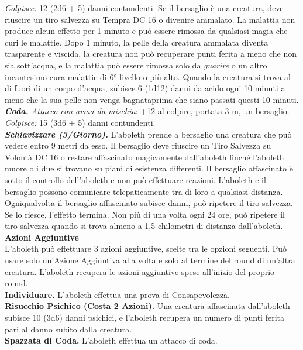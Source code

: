 \begin{multicols}{2}
\emph{Colpisce:} 12 (2d6 + 5) danni contundenti. Se il bersaglio è una creatura, deve riuscire un tiro salvezza su Tempra DC  16 o divenire ammalato. La malattia non produce alcun effetto per 1 minuto e può essere rimossa da qualsiasi magia che curi le malattie. Dopo 1 minuto, la pelle della creatura ammalata diventa trasparente e viscida, la creatura non può recuperare punti ferita a meno che non sia sott'acqua, e la malattia può essere rimossa solo da \emph{guarire} o un altro incantesimo cura malattie di 6° livello o più alto. Quando la creatura si trova al di fuori di un corpo d'acqua, subisce 6 (1d12) danni da acido ogni 10 minuti a meno che la sua pelle non venga bagnataprima che siano  passati questi 10 minuti. \\
\emph{\textbf{Coda.} Attacco con arma da mischia}: +12 al colpire, portata 3 m, un bersaglio.\\
\emph{Colpisce:} 15 (3d6 + 5) danni contundenti.\\
\emph{\textbf{Schiavizzare (3/Giorno).}} L'aboleth prende a bersaglio
una creatura che può vedere entro 9 metri da esso. Il bersaglio deve
riuscire un Tiro Salvezza su Volontà DC  16 o restare affascinato
magicamente dall'aboleth finché l'aboleth muore o i due si trovano su
piani di esistenza differenti. Il bersaglio affascinato è sotto il
controllo dell'aboleth e non può effettuare reazioni. L'aboleth e il
bersaglio possono comunicare telepaticamente tra di loro a qualsiasi
distanza.\\
Ogniqualvolta il bersaglio affascinato subisce danni, può ripetere il
tiro salvezza. Se lo riesce, l'effetto termina. Non più di una volta
ogni 24 ore, può ripetere il tiro salvezza quando si trova almeno a 1,5
chilometri di distanza dall'aboleth.\\
\textbf{Azioni Aggiuntive}\\
L'aboleth può effettuare 3 azioni aggiuntive, scelte tra le opzioni seguenti. Può usare solo un'Azione Aggiuntiva alla volta e solo al termine del round di un'altra creatura. L'aboleth recupera le azioni aggiuntive spese all'inizio del proprio round.\\
\textbf{Individuare.} L'aboleth effettua una prova di Consapevolezza. \\
\textbf{Risucchio Psichico (Costa 2 Azioni).} Una creatura affascinata dall'aboleth subisce 10 (3d6) danni psichici, e l'aboleth recupera un numero di punti ferita pari al danno subito dalla creatura.\\
\textbf{Spazzata di Coda.} L'aboleth effettua un attacco di coda.\\

\end{multicols}
